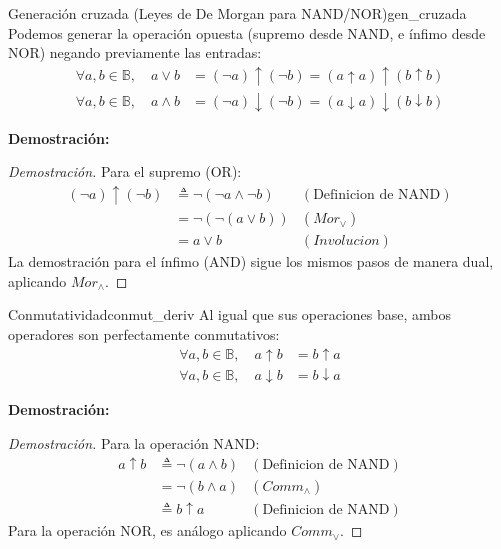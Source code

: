 \documentclass[12pt,a4paper]{article}
\newcommand{\desplegable}[2]{%
  \par\vspace{1ex}\noindent
  \textbf{Demostración:}
  \vspace{1ex}
  
  #2
  \par\vspace{1ex}
}
\begin{document}
\begin{teorema}{Generación cruzada (Leyes de De Morgan para NAND/NOR)}{gen_cruzada}
Podemos generar la operación opuesta (supremo desde NAND, e ínfimo desde NOR) negando previamente las entradas:
\begin{align*}
    \forall a, b \in \mathbb{B}, \quad a \vee b &= (\neg a) \uparrow (\neg b) = (a \uparrow a) \uparrow (b \uparrow b) \\
    \forall a, b \in \mathbb{B}, \quad a \wedge b &= (\neg a) \downarrow (\neg b) = (a \downarrow a) \downarrow (b \downarrow b)
\end{align*}
\end{teorema}
\desplegable{proof_gen_cruzada}{
\begin{proof}[Demostración]
Para el supremo (OR):
\begin{align*}
    (\neg a) \uparrow (\neg b) &\triangleq \neg (\neg a \wedge \neg b) & (\text{Definicion de NAND}) \\
                               &= \neg (\neg (a \vee b)) & (Mor_\vee) \\
                               &= a \vee b & (Involucion)
\end{align*}
La demostración para el ínfimo (AND) sigue los mismos pasos de manera dual, aplicando $Mor_\wedge$.
\end{proof}
}

\begin{teorema}{Conmutatividad}{conmut_deriv}
Al igual que sus operaciones base, ambos operadores son perfectamente conmutativos:
\begin{align*}
    \forall a, b \in \mathbb{B}, \quad a \uparrow b &= b \uparrow a \\
    \forall a, b \in \mathbb{B}, \quad a \downarrow b &= b \downarrow a
\end{align*}
\end{teorema}
\desplegable{proof_conmut_deriv}{
\begin{proof}[Demostración]
Para la operación NAND:
\begin{align*}
    a \uparrow b &\triangleq \neg (a \wedge b) & (\text{Definicion de NAND}) \\
                 &= \neg (b \wedge a) & (Comm_\wedge) \\
                 &\triangleq b \uparrow a & (\text{Definicion de NAND})
\end{align*}
Para la operación NOR, es análogo aplicando $Comm_\vee$.
\end{proof}
}
\end{document}
